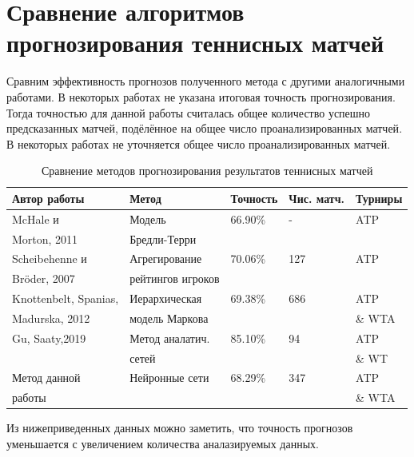 \section{Сравнение алгоритмов прогнозирования теннисных матчей}
Сравним эффективность прогнозов полученного метода с другими аналогичными работами.
В некоторых работах не указана итоговая точность прогнозирования. Тогда точностью для данной работы считалась общее количество успешно предсказанных матчей, подёлённое на общее число проанализированных матчей\cite{Book40}. В некоторых работах не уточняется общее число проанализированных матчей.
\begin{table}[!h]
	
	\caption{\label{tab:issled1}Сравнение методов прогнозирования результатов теннисных матчей}
	
	\begin{center}
		
		\begin{tabular}{|l|l|l|l|l|}
			
			\hline
			
			Автор работы& Метод & Точность & Чис. матч.& Турниры  \\
			
			\hline 
			
			McHale и & Модель& 66.90\% & - & ATP  \\
			Morton, 2011  \cite{Book18} & Бредли-Терри& & &  \\
			\hline
			Scheibehenne и  & Агрегирование  & 70.06\% & 127 & ATP  \\
			Bröder,
			2007\cite{Book40} &рейтингов игроков&&& \\
			\hline
			Knottenbelt, Spanias,& Иерархическая & 69.38\% & 686& ATP  	\\		Madurska, 2012\cite{Book41} & модель Маркова& && \& WTA \\
			\hline
			Gu, Saaty,2019\cite{Book42} &Метод аналатич.& 85.10\%&94&ATP \\
			&сетей&&&\& WT\\
			\hline
			Метод данной &Нейронные сети& 68.29\%&347&ATP \\
			работы &&&&\& WTA\\
			\hline
		\end{tabular}
		
	\end{center}
	
\end{table}
 Из нижеприведенных данных можно заметить, что точность прогнозов уменьшается с увеличением количества аналазируемых данных.

